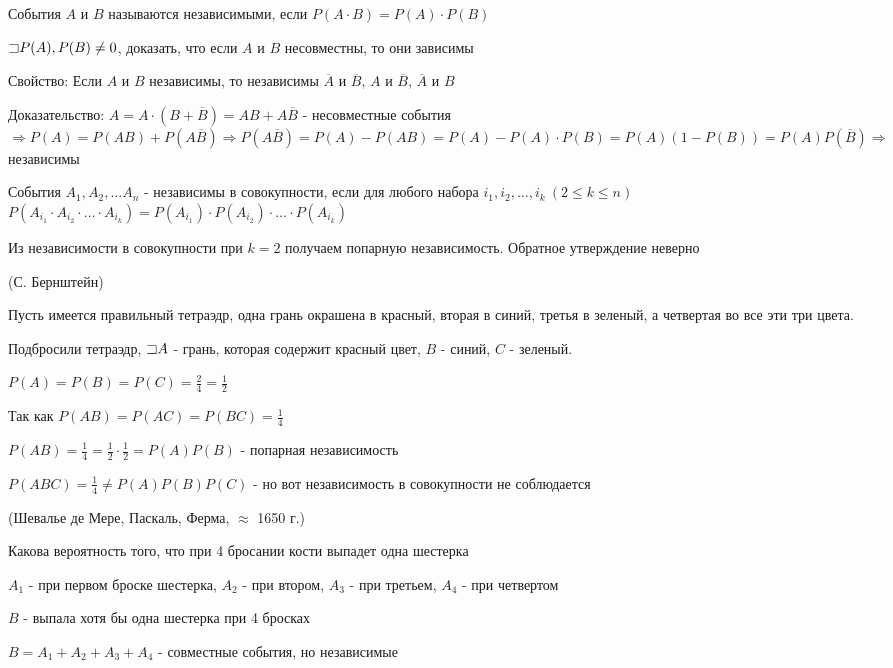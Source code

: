 \documentclass[12pt]{article}
\begin{document}
    \Def События $A$ и $B$ называются независимыми, если $P(A \cdot B) = P(A) \cdot P(B)$

    \Lab $\mathord{\sqsupset} P(A), P(B) \neq 0$, доказать, что если $A$ и $B$ несовместны, то они зависимы

    Свойство: Если $A$ и $B$ независимы, то независимы $\overline{A}$ и $\overline{B}$, $A$ и $\overline{B}$, $\overline{A}$ и $B$

    Доказательство: $A = A \cdot (B + \overline{B}) = AB + A\overline{B}$ - несовместные события $\Longrightarrow P(A) = P(AB) + P(A\overline{B}) \Longrightarrow P(A\overline{B}) = P(A) - P(AB) =
    P(A) - P(A) \cdot P(B) = P(A) (1 - P(B)) = P(A) P(\overline{B}) \Longrightarrow$ независимы

    \Def События $A_1, A_2, \dots A_n$ - независимы в совокупности, если для любого набора $i_1, i_2, \dots, i_k \ (2 \leq k \leq n)$
    $P(A_{i_1} \cdot A_{i_2} \cdot \dots \cdot A_{i_k}) = P(A_{i_1}) \cdot P(A_{i_2}) \cdot \dots \cdot P(A_{i_k})$

    \Nota Из независимости в совокупности при $k = 2$ получаем попарную независимость. Обратное утверждение неверно

    \Ex (С. Бернштейн)

    Пусть имеется правильный тетраэдр, одна грань окрашена в красный, вторая в синий, третья в зеленый, а четвертая во все эти три цвета.

    Подбросили тетраэдр, $\mathord{\sqsupset} A$ - грань, которая содержит красный цвет, $B$ - синий, $C$ - зеленый.

    $P(A) = P(B) = P(C) = \frac{2}{4} = \frac{1}{2}$

    Так как $P(AB) = P(AC) = P(BC) = \frac{1}{4}$

    $P(AB) = \frac{1}{4} = \frac{1}{2} \cdot \frac{1}{2} = P(A) P(B)$ - попарная независимость

    $P(ABC) = \frac{1}{4} \neq P(A) P(B) P(C)$ - но вот независимость в совокупности не соблюдается

    \Ex (Шевалье де Мере, Паскаль, Ферма, $\approx$ 1650 г.)

    Какова вероятность того, что при 4 бросании кости выпадет одна шестерка

    $A_1$ - при первом броске шестерка, $A_2$ - при втором, $A_3$ - при третьем, $A_4$ - при четвертом

    $B$ - выпала хотя бы одна шестерка при 4 бросках

    $B = A_1 + A_2 + A_3 + A_4$ - совместные события, но независимые
\end{document}
